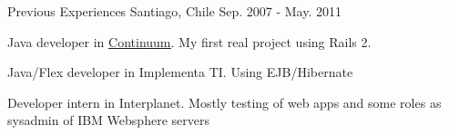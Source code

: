 \begin{cventries}
  \cventry
    {} %
    {Previous Experiences} %
    {Santiago, Chile} %
    {Sep. 2007 - May. 2011} %
    {
      \begin{cvitems} %
        \item { Java developer in \href{http://www.continuumhq.co/}{\underline{Continuum}}. My first real project using Rails 2. }
        \item { Java/Flex developer in Implementa TI. Using EJB/Hibernate }
        \item { Developer intern in Interplanet. Mostly testing of web apps and some roles as sysadmin of IBM Websphere servers }
      \end{cvitems}
    }

\end{cventries}
